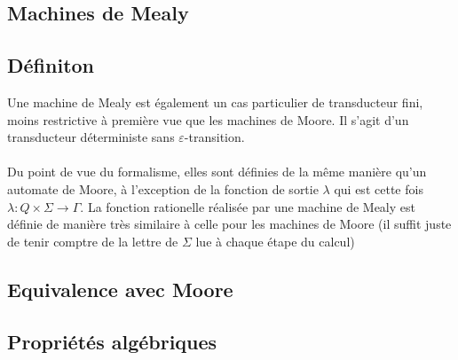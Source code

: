 \documentclass{scrartcl}
\begin{document}
\begin{flushleft}
\section{Machines de Mealy}

\subsection{Définiton}

Une machine de Mealy est également un cas particulier de transducteur fini, moins restrictive à première vue que les machines de Moore.
Il s'agit d'un transducteur déterministe sans $\varepsilon$-transition.
\\~\\
Du point de vue du formalisme, elles sont définies de la même manière qu'un automate de Moore, à l'exception de la fonction de sortie
$\lambda$ qui est cette fois $\lambda : Q \times \Sigma \rightarrow \Gamma$. La fonction rationelle réalisée par une machine de Mealy
est définie de manière très similaire à celle pour les machines de Moore (il suffit juste de tenir comptre de la lettre de $\Sigma$ lue à chaque
étape du calcul)

\subsection{Equivalence avec Moore}

\subsection{Propriétés algébriques}

\end{flushleft}
\end{document}
